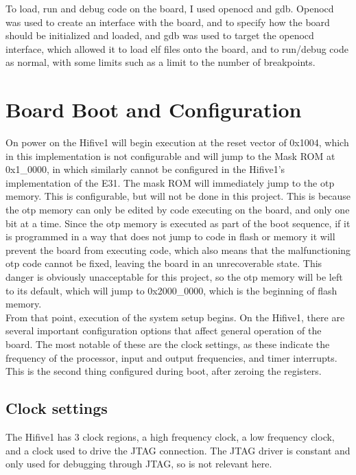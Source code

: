 To load, run and debug code on the board, I used openocd and gdb. Openocd was used to create an interface with the board, and to specify how the board should be initialized and loaded, and gdb was used to target the openocd interface, which allowed it to load elf files onto the board, and to run/debug code as normal, with some limits such as a limit to the number of breakpoints.
\section{Board Boot and Configuration}
On power on the Hifive1 will begin execution at the reset vector of 0x1004, which in this implementation is not configurable and will jump to the Mask ROM at 0x1\_0000, in which similarly cannot be configured in the Hifive1's implementation of the E31. The mask ROM will immediately jump to the \ac{otp} memory. This is configurable, but will not be done in this project. This is because the \ac{otp} memory can only be edited by code executing on the board, and only one bit at a time. Since the \ac{otp} memory is executed as part of the boot sequence, if it is programmed in a way that does not jump to code in flash or memory it will prevent the board from executing code, which also means that the malfunctioning \ac{otp} code cannot be fixed, leaving the board in an unrecoverable state. This danger is obviously unacceptable for this project, so the \ac{otp} memory will be left to its default, which will jump to 0x2000\_0000, which is the beginning of flash memory.\\
From that point, execution of the system setup begins.
On the Hifive1, there are several important configuration options that affect general operation of the board. The most notable of these are the clock settings, as these indicate the frequency of the processor, input and output frequencies, and timer interrupts. This is the second thing configured during boot, after zeroing the registers.
\subsection{Clock settings}
The Hifive1 has 3 clock regions, a high frequency clock, a low frequency clock, and a clock used to drive the JTAG connection. The JTAG driver is constant and only used for debugging through JTAG, so is not relevant here.
\\


